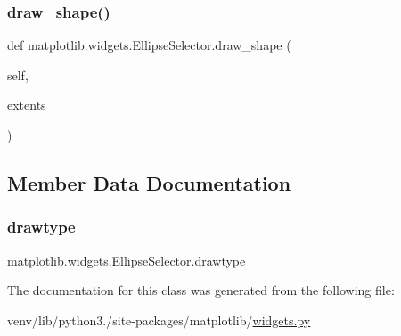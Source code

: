\subsubsection{\texorpdfstring{draw\+\_\+shape()}{draw\_shape()}}
{\footnotesize\ttfamily def matplotlib.\+widgets.\+Ellipse\+Selector.\+draw\+\_\+shape (\begin{DoxyParamCaption}\item[{}]{self,  }\item[{}]{extents }\end{DoxyParamCaption})}



\subsection{Member Data Documentation}
\mbox{\label{classmatplotlib_1_1widgets_1_1EllipseSelector_a90f4ef54eb28c8119317a88b532a3393}} 
\subsubsection{\texorpdfstring{drawtype}{drawtype}}
{\footnotesize\ttfamily matplotlib.\+widgets.\+Ellipse\+Selector.\+drawtype}



The documentation for this class was generated from the following file\+:\begin{DoxyCompactItemize}
\item 
venv/lib/python3./site-\/packages/matplotlib/\hyperlink{widgets_8py}{widgets.\+py}\end{DoxyCompactItemize}
